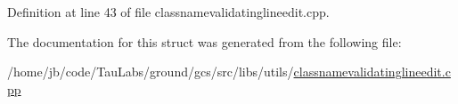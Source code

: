 \-Definition at line 43 of file classnamevalidatinglineedit.\-cpp.



\-The documentation for this struct was generated from the following file\-:\begin{DoxyCompactItemize}
\item 
/home/jb/code/\-Tau\-Labs/ground/gcs/src/libs/utils/\hyperlink{classnamevalidatinglineedit_8cpp}{classnamevalidatinglineedit.\-cpp}\end{DoxyCompactItemize}
